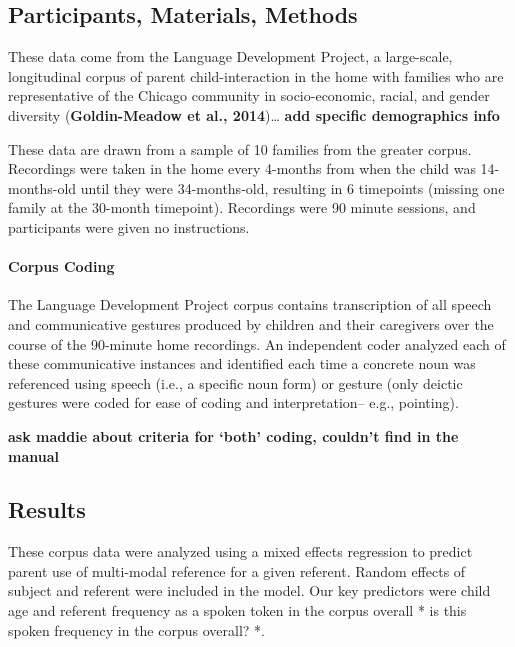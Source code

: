 \documentclass[10pt, letterpaper]{article}
\begin{document}
\hypertarget{participants-materials-methods}{%
\subsection{Participants, Materials,
Methods}\label{participants-materials-methods}}

These data come from the Language Development Project, a large-scale,
longitudinal corpus of parent child-interaction in the home with
families who are representative of the Chicago community in
socio-economic, racial, and gender diversity (\textbf{Goldin-Meadow et
al., 2014})\ldots{} \textbf{add specific demographics info}

These data are drawn from a sample of 10 families from the greater
corpus. Recordings were taken in the home every 4-months from when the
child was 14-months-old until they were 34-months-old, resulting in 6
timepoints (missing one family at the 30-month timepoint). Recordings
were 90 minute sessions, and participants were given no instructions.

\hypertarget{corpus-coding}{%
\paragraph{Corpus Coding}\label{corpus-coding}}

The Language Development Project corpus contains transcription of all
speech and communicative gestures produced by children and their
caregivers over the course of the 90-minute home recordings. An
independent coder analyzed each of these communicative instances and
identified each time a concrete noun was referenced using speech (i.e.,
a specific noun form) or gesture (only deictic gestures were coded for
ease of coding and interpretation-- e.g., pointing).

\textbf{ask maddie about criteria for `both' coding, couldn't find in
the manual}

\hypertarget{results}{%
\subsection{Results}\label{results}}

These corpus data were analyzed using a mixed effects regression to
predict parent use of multi-modal reference for a given referent. Random
effects of subject and referent were included in the model. Our key
predictors were child age and referent frequency as a spoken token in
the corpus overall * is this spoken frequency in the corpus overall? *.
\end{document}

